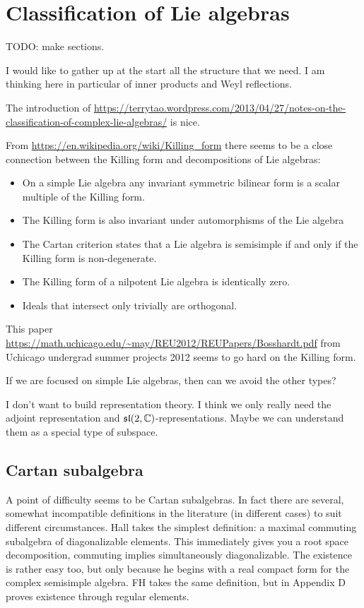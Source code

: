 

\chapter{Classification of Lie algebras}

TODO: make sections.

I would like to gather up at the start all the structure that we need. I am thinking here in particular of inner products and Weyl reflections.

The introduction of \url{https://terrytao.wordpress.com/2013/04/27/notes-on-the-classification-of-complex-lie-algebras/} is nice.

From \url{https://en.wikipedia.org/wiki/Killing_form} there seems to be a close connection between the Killing form and decompositions of Lie algebras:
\begin{itemize}
\item On a simple Lie algebra any invariant symmetric bilinear form is a scalar multiple of the Killing form.
\item The Killing form is also invariant under automorphisms of the Lie algebra
\item The Cartan criterion states that a Lie algebra is semisimple if and only if the Killing form is non-degenerate.
\item The Killing form of a nilpotent Lie algebra is identically zero.
\item Ideals that intersect only trivially are orthogonal.
\end{itemize}
This paper \url{https://math.uchicago.edu/~may/REU2012/REUPapers/Bosshardt.pdf} from Uchicago undergrad summer projects 2012 seems to go hard on the Killing form.

If we are focused on simple Lie algebras, then can we avoid the other types?

I don't want to build representation theory.
I think we only really need the adjoint representation and $\mathfrak{sl}(2,\mathbb{C})$-representations.
Maybe we can understand them as a special type of subspace.


\section{Cartan subalgebra}
A point of difficulty seems to be Cartan subalgebras.
In fact there are several, somewhat incompatible definitions in the literature (in different cases) to suit different circumstances.
Hall takes the simplest definition: a maximal commuting subalgebra of diagonalizable elements.
This immediately gives you a root space decomposition, commuting implies simultaneously diagonalizable.
The existence is rather easy too, but only because he begins with a real compact form for the complex semisimple algebra.
FH takes the same definition, but in Appendix D proves existence through regular elements.

